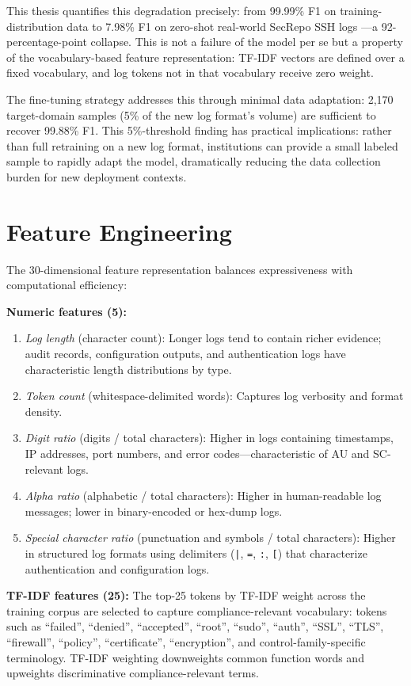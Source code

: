 \documentclass[12pt,oneside]{report}
\begin{document}
This thesis quantifies this degradation precisely: from 99.99\% F1 on training-distribution data to 7.98\% F1 on zero-shot real-world SecRepo SSH logs \cite{secrepo}—a 92-percentage-point collapse. This is not a failure of the model per se but a property of the vocabulary-based feature representation: TF-IDF vectors are defined over a fixed vocabulary, and log tokens not in that vocabulary receive zero weight.

The fine-tuning strategy addresses this through minimal data adaptation: 2,170 target-domain samples (5\% of the new log format's volume) are sufficient to recover 99.88\% F1. This 5\%-threshold finding has practical implications: rather than full retraining on a new log format, institutions can provide a small labeled sample to rapidly adapt the model, dramatically reducing the data collection burden for new deployment contexts.

\section{Feature Engineering}
\label{sec:features}

The 30-dimensional feature representation balances expressiveness with computational efficiency:

\textbf{Numeric features (5):}
\begin{enumerate}[label=\arabic*.]
  \item \textit{Log length} (character count): Longer logs tend to contain richer evidence; audit records, configuration outputs, and authentication logs have characteristic length distributions by type.
  \item \textit{Token count} (whitespace-delimited words): Captures log verbosity and format density.
  \item \textit{Digit ratio} (digits / total characters): Higher in logs containing timestamps, IP addresses, port numbers, and error codes—characteristic of AU and SC-relevant logs.
  \item \textit{Alpha ratio} (alphabetic / total characters): Higher in human-readable log messages; lower in binary-encoded or hex-dump logs.
  \item \textit{Special character ratio} (punctuation and symbols / total characters): Higher in structured log formats using delimiters (\texttt{|}, \texttt{=}, \texttt{:}, \texttt{[}) that characterize authentication and configuration logs.
\end{enumerate}

\textbf{TF-IDF features (25):} The top-25 tokens by TF-IDF weight across the training corpus are selected to capture compliance-relevant vocabulary: tokens such as ``failed'', ``denied'', ``accepted'', ``root'', ``sudo'', ``auth'', ``SSL'', ``TLS'', ``firewall'', ``policy'', ``certificate'', ``encryption'', and control-family-specific terminology. TF-IDF weighting downweights common function words and upweights discriminative compliance-relevant terms.
\end{document}
